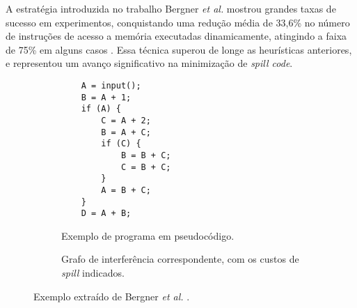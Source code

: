 \documentclass[
	12pt,				%
	openright,			%
	oneside,			%
	a4paper,			%
	tccpreliminar,			%
	]{ABNT-DC-UEL}
\begin{document}
A estratégia introduzida no trabalho Bergner \textit{et al.} mostrou grandes taxas de sucesso em experimentos, conquistando uma redução média de 33,6\% no número de instruções de acesso a memória executadas dinamicamente, atingindo a faixa de 75\% em alguns casos \cite{bergner:97}. Essa técnica superou de longe as heurísticas anteriores, e representou um avanço significativo na minimização de \textit{spill code}. 

\begin{figure}[h]
    \centering
    \begin{subfigure}{0.45\textwidth}
        \centering
        \begin{lstlisting}
    A = input();
    B = A + 1;
    if (A) {
        C = A + 2;
        B = A + C;
        if (C) {
            B = B + C;
            C = B + C;
        }
        A = B + C;
    }
    D = A + B;
        \end{lstlisting}
        \caption{Exemplo de programa em pseudocódigo.}
        \label{bergner-1}
    \end{subfigure}
    \begin{subfigure}{0.45\textwidth}
        \centering
        \caption{Grafo de interferência correspondente, com os custos de \textit{spill} indicados.}
        \label{bergner-2}
    \end{subfigure}
    \caption{Exemplo extraído de Bergner \textit{et al.} \cite{bergner:97}.}
\end{figure}
\end{document}
